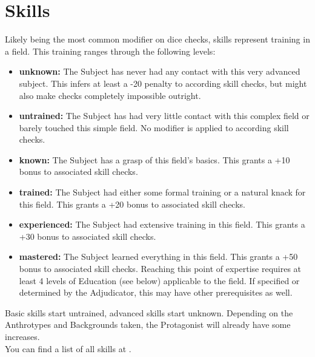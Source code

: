 \documentclass[11pt,a4paper,openany,dvipsnames]{book}
\begin{document}
	\section{Skills}
	\label{sec:Skills}
	Likely being the most common modifier on dice checks, skills represent training in a field.
	This training ranges through the following levels:
	\begin{itemize}
		\setlength\itemsep{-8mm}
		\item \textbf{unknown:} The Subject has never had any contact with this very advanced subject.
		This infers at least a -20 penalty to according skill checks,
			but might also make checks completely impossible outright.
		\item \textbf{untrained:} The Subject has had very little contact with this complex field or barely touched this simple field.
			No modifier is applied to according skill checks.
		\item \textbf{known:} The Subject has a grasp of this field’s basics.
			This grants a +10 bonus to associated skill checks.
		\item \textbf{trained:} The Subject had either some formal training or a natural knack for this field.
			This grants a +20 bonus to associated skill checks.
		\item \textbf{experienced:} The Subject had extensive training in this field.
			This grants a +30 bonus to associated skill checks.
		\item \textbf{mastered:} The Subject learned everything in this field.
			This grants a +50 bonus to associated skill checks.
			Reaching this point of expertise requires at least 4 levels of Education (see below) applicable to the field.
			If specified or determined by the Adjudicator,
				this may have other prerequisites as well.
	\end{itemize}
	Basic skills start untrained, advanced skills start unknown.
	Depending on the Anthrotypes and Backgrounds taken,
		the Protagonist will already have some increases.
	\\%
	You can find a list of all skills at \pageref{skilllist}.
\end{document}
